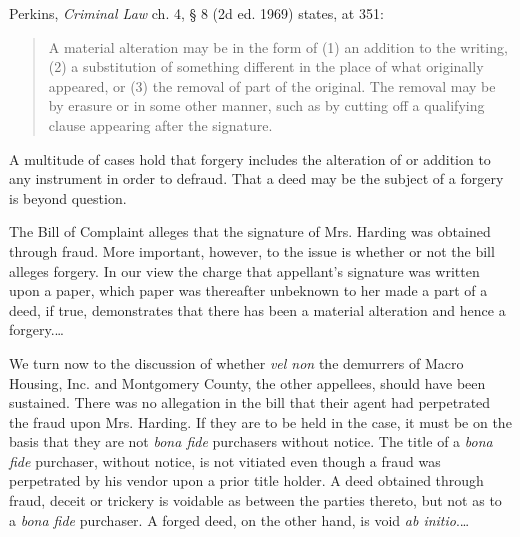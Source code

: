 Perkins, \textit{Criminal Law} ch. 4, {\S} 8 (2d ed. 1969) states, at 351:
\begin{quote}
A material alteration may be in the form of (1) an addition to the writing, (2)
a substitution of something different in the place of what originally appeared,
or (3) the removal of part of the original. The removal may be by erasure or in
some other manner, such as by cutting off a qualifying clause appearing after
the signature. 
\end{quote}

A multitude of cases hold that forgery includes the alteration of or addition to
any instrument in order to defraud. That a deed may be the subject of a forgery
is beyond question. 

The Bill of Complaint alleges that the signature of Mrs. Harding was obtained
through fraud. More important, however, to the issue is whether or not the bill
alleges forgery. In our view the charge that appellant's signature was written
upon a paper, which paper was thereafter unbeknown to her made a part of a
deed, if true, demonstrates that there has been a material alteration and hence
a forgery.\ldots

We turn now to the discussion of whether \textit{vel non} the demurrers of Macro
Housing, Inc. and Montgomery County, the other appellees, should have been
sustained. There was no allegation in the bill that their agent had perpetrated
the fraud upon Mrs. Harding. If they are to be held in the case, it must be on
the basis that they are not \textit{bona fide }purchasers without notice. The
title of a \textit{bona fide }purchaser, without notice, is not vitiated even
though a fraud was perpetrated by his vendor upon a prior title holder. A deed
obtained through fraud, deceit or trickery is voidable as between the parties
thereto, but not as to a \textit{bona fide }purchaser. A forged deed, on the
other hand, is void \textit{ab initio}.\ldots

